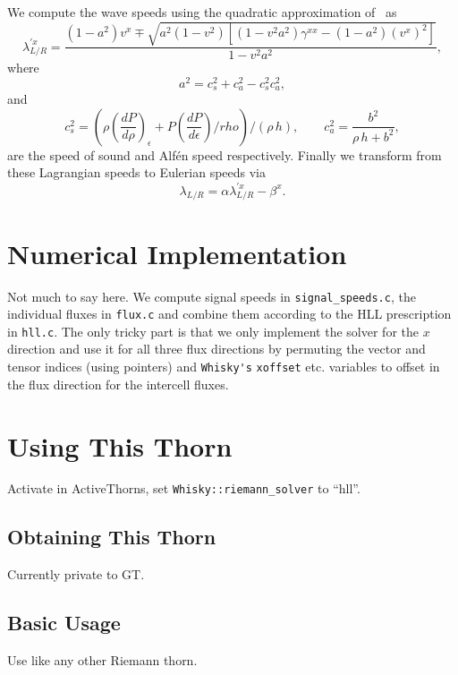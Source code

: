 We compute the wave speeds using the quadratic approximation of~\cite{echo} as
\begin{equation}
    \lambda^{\prime x}_{L/R} = \frac{(1-a^2) v^x \mp 
                       \sqrt{a^2 (1-v^2) [(1-v^2a^2) \gamma^{xx} -
                                          (1-a^2)(v^x)^2]}
                      }{1-v^2a^2},
\end{equation}
where 
\begin{equation}
    a^2 = c_s^2 + c_a^2 - c_s^2 c_a^2,
\end{equation}
and
\begin{equation}
    c_s^2 = (\rho\left(\frac{dP}{d\rho}\right)_\epsilon + P
    \left(\frac{dP}{d\epsilon}\right)/rho) / (\rho \, h),
    \qquad
    c_a^2 = \frac{b^2}{\rho\, h + b^2},
\end{equation}
are the speed of sound and Alf\'en speed respectively. Finally we transform
from these Lagrangian speeds to Eulerian speeds via
\begin{equation}
    \lambda_{L/R} = \alpha \lambda^{\prime x}_{L/R} - \beta^x.
\end{equation}

\section{Numerical Implementation}
Not much to say here. We compute signal speeds in \verb|signal_speeds.c|,
the individual fluxes in \verb|flux.c| and combine them according to the HLL
prescription in \verb|hll.c|. The only tricky part is that we only implement
the solver for the $x$ direction and use it for all three flux directions by
permuting the vector and tensor indices (using pointers) and \verb|Whisky's|
\verb|xoffset| etc. variables to offset in the flux direction for the
intercell fluxes.

\section{Using This Thorn}
Activate in ActiveThorns, set \verb|Whisky::riemann_solver| to ``hll''.

\subsection{Obtaining This Thorn}
Currently private to GT. 

\subsection{Basic Usage}
Use like any other Riemann thorn.

